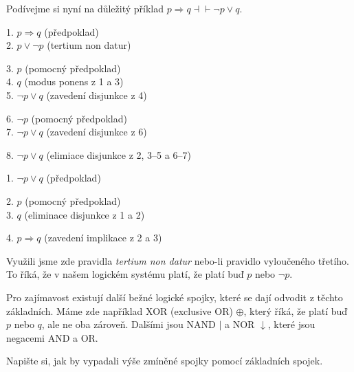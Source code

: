\begin{example}
  Podívejme si nyní na důležitý příklad $p\Rightarrow q \dashv\vdash \neg p\lor q$. 
  \begin{proofbox}
    1. $p \Rightarrow q$ (předpoklad) \\
    2. $p \lor \neg p$ (tertium non datur) 
    \begin{proofbox}
      3. $p$ (pomocný předpoklad) \\
      4. $q$ (modus ponens z 1 a 3) \\
      5. $\neg p \lor q$ (zavedení disjunkce z 4)
    \end{proofbox}
    \begin{proofbox}
      6. $\neg p$ (pomocný předpoklad) \\
      7. $\neg p \lor q$ (zavedení disjunkce z 6)
    \end{proofbox}
    8. $\neg p \lor q$ (elimiace disjunkce z 2, 3--5 a 6--7)
  \end{proofbox}
  \begin{proofbox}
    1. $\neg p \lor q$ (předpoklad) 
    \begin{proofbox}
      2. $p$ (pomocný předpoklad) \\
      3. $q$ (eliminace disjunkce z 1 a 2) 
    \end{proofbox}
    4. $p \Rightarrow q$ (zavedení implikace z 2 a 3)
  \end{proofbox}
  Využili jsme zde pravidla \textit{tertium non datur} nebo-li pravidlo vyloučeného třetího. To říká, že v našem logickém systému platí, že platí buď $p$ nebo $\neg p$.
\end{example}

Pro zajímavost existují další bežné logické spojky, které se dají odvodit z těchto základních. Máme zde například XOR (exclusive OR) $\oplus$, který říká, že platí buď $p$ nebo $q$, ale ne oba zároveň. Dalšími jsou NAND $\mid$ a NOR $\downarrow$, které jsou negacemi AND a OR.\@ 

\begin{problem}
  Napište si, jak by vypadali výše zmíněné spojky pomocí základních spojek.
\end{problem}


